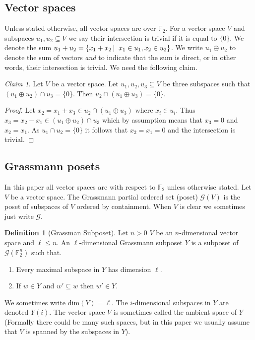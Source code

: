 \documentclass[10pt,a4paper]{article}
\theoremstyle{definition}
\newtheorem{definition}[theorem]{Definition}
\theoremstyle{remark}
\newtheorem{claim}[theorem]{Claim}
\newcommand\sett[2]{\left\{ #1 \left| \; \vphantom{#1 #2} \right. #2  \right\}}
\newcommand{\set}[1]{\{#1\}}
\def\dim{\mathrm{ dim}}
\renewcommand{\leq}{\leqslant}
\numberwithin{equation}{section}
\def\Gr{\mathcal{G}}
\def\Y{Y}
\begin{document}
\subsection{Vector spaces} \label{sec:vec-spaces-defs}
Unless stated otherwise, all vector spaces are over \(\mathbb{F}_2\). For a vector space \(V\) and subspaces \(u_1,u_2 \subseteq V\) we say their intersection is trivial if it is equal to \(\set{0}\). We denote the sum \(u_1 + u_2 = \sett{x_1+x_2}{x_1 \in u_1, x_2 \in u_2}\). We write \(u_1 \oplus u_2\) to denote the sum of vectors \emph{and} to indicate that the sum is direct, or in other words, their intersection is trivial. We need the following claim.
    \begin{claim}\label{claim:basic-three-spaces}
        Let \(V\) be a vector space. Let \(u_1,u_2,u_3 \subseteq V\) be three subspaces such that \((u_1 \oplus u_2) \cap u_3 = \set{0}\). Then \(u_2 \cap (u_1 \oplus u_3) = \set{0}\).
    \end{claim}
    \begin{proof}
        Let \(x_2 = x_1 + x_3 \in u_2 \cap (u_1 \oplus u_3)\) where \(x_i \in u_i\). Thus \(x_3 = x_2-x_1 \in (u_1 \oplus u_2) \cap u_3\) which by assumption means that \(x_3=0\) and \(x_2=x_1\). As \(u_1 \cap u_2 = \set{0}\) it follows that \(x_2=x_1=0\) and the intersection is trivial. 
    \end{proof}
    
\subsection{Grassmann posets} \label{sec:prelims-Grassmann}
In this paper all vector spaces are with respect to \(\mathbb{F}_2\) unless otherwise stated. Let \(V\) be a vector space. The Grassmann partial ordered set (poset) \(\Gr(V)\) is the poset of subspaces of \(V\) ordered by containment. When \(V\) is clear we sometimes just write \(\Gr\).
\begin{definition}[Grassman Subposet] \label{def:grass-sbpt}
    Let \(n > 0\) \(V\) be an \(n\)-dimensional vector space and \(\ell \leq n\). An \(\ell\)-dimensional Grassmann subposet \(\Y\) is a subposet of \(\Gr(\mathbb{F}_2^n)\) such that.
\begin{enumerate}
    \item Every maximal subspace in \(\Y\) has dimension \(\ell\).
    \item If \(w \in \Y\) and \(w' \subseteq w\) then \(w' \in \Y\).
\end{enumerate}
\end{definition}
We sometimes write \(\dim(\Y) = \ell\). The \(i\)-dimensional subspaces in \(\Y\) are denoted \(\Y(i)\). The vector space \(V\) is sometimes called the ambient space of \(\Y\) (Formally there could be many such spaces, but in this paper we usually assume that \(V\) is spanned by the subspaces in \(\Y\)).
\end{document}
